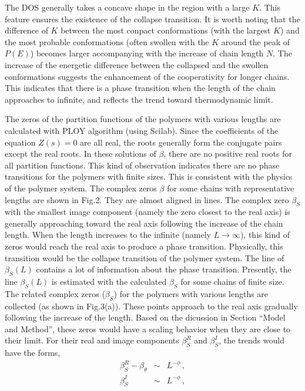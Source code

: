\documentclass[preprint,preprintnumbers,amsmath,amssymb,showpacs,aps,pre]{revtex4-1}
\begin{document}
The DOS generally takes a concave shape in the region with a large $K$. This
feature ensures the existence of the collapse transition. It is worth noting
that the difference of $K$ between the most conpact conformations (with the
largest $K$) and the most probable conformations (often swollen with the $K$
around the peak of $P(E)$) becomes larger accompanying with the increase of
chain length $N$. The increase of the energetic difference between the
collapsed and the swollen conformations suggests the enhancement of the
cooperativity for longer chains. This indicates that there is a phase
transition when the length of the chain approaches to infinite, and reflects
the trend toward thermodynamic limit.

The zeros of the partition functions of the polymers with various lengths are
calculated with PLOY algorithm (using Scilab). Since the coefficients of the
equation $Z(s)=0$ are all real, the roots generally form the conjugate pairs
except the real roots. In these solutions of $\beta$, there are no positive
real roots for all partition functions. This kind of observation indicates
there are no phase transitions for the polymers with finite sizes. This is
consistent with the physics of the polymer system. The complex zeros $\beta$
for some chains with representative lengths are shown in Fig.2. They are
almost aligned in lines. The complex zero $\beta_S$ with the smallest image
component (namely the zero closest to the real axis) is generally approaching
toward the real axis following the increase of the chain length. When the
length increases to the infinite (namely $L\rightarrow\infty$), this kind of
zeros would reach the real axis to produce a phase transition. Physically,
this transition would be the collapse transition of the polymer system. The
line of $\beta_S(L)$ contains a lot of information about the phase transition.
Presently, the line $\beta_S(L)$ is estimated with the calculated $\beta_S$
for some chains of finite size. The related complex zeros ($\beta_S$) for the
polymers with various lengths are collected (as shown in Fig.3(a)). These
points approach to the real axis gradually following the increase of the
length. Based on the dicussion in Section ``Model and Method'', these zeros
would have a scaling behavior when they are close to their limit. For their
real and image components $\beta_S^R$ and $\beta_S^I$, the trends would have
the forms,
\begin{eqnarray}
\beta_S^R - \beta_{\theta}  &\sim&  L^{-\phi} \, , \\
\beta_S^I  &\sim&  L^{-\phi} \, ,
\end{eqnarray}
\end{document}
